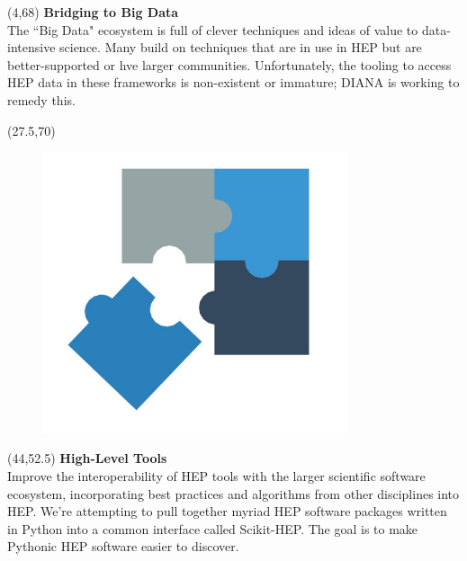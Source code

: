 \documentclass[final]{beamer}
\begin{document}
\begin{frame}{}

\begin{textblock}{22.5}(4,68)
\textcolor{mybluelabel}{\bf Bridging to Big Data} \\
The ``Big Data" ecosystem is full of clever techniques and ideas of value to data-intensive science.
Many build on techniques that are in use in HEP but are better-supported or hve larger communities.
Unfortunately, the tooling to access HEP data in these frameworks is non-existent or immature;
DIANA is working to remedy this.
\end{textblock}

\begin{textblock}{12.5}(27.5,70)
\begin{figure}[tbph]
\centering
\includegraphics[width=0.8\textwidth]{interoperable.jpg}
\end{figure}
\end{textblock}


\begin{textblock}{22.5}(44,52.5)
\textcolor{mybluelabel}{\bf High-Level Tools} \\
Improve the interoperability of HEP tools with the larger scientific software ecosystem, incorporating best practices and algorithms from other disciplines into HEP.
We're attempting to pull together myriad HEP software packages written in Python into a common interface called Scikit-HEP.
The goal is to make Pythonic HEP software easier to discover.
\end{textblock}


\end{frame}
\end{document}
